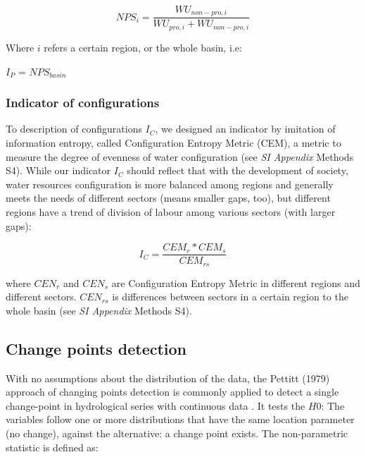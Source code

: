 \documentclass[9pt, twocolumn, twoside, lineno]{pnas-new}
\begin{document}
{	$$ NPS_{i} = \frac{WU_{non-pro, i}}{WU_{pro, i} + WU_{non-pro, i}} $$

	Where $i$ refers a certain region, or the whole basin, i.e:

	$I_P$ = $NPS_{basin}$

	\subsubsection*{Indicator of configurations}
	To description of configurations $I_C$, we designed an indicator by imitation of information entropy, called Configuration Entropy Metric (CEM), a metric to measure the degree of evenness of water configuration (see \textit{SI Appendix} Methods S4).
	While our indicator $I_C$ should reflect that with the development of society, water resources configuration is more balanced among regions and generally meets the needs of different sectors (means smaller gaps, too), but different regions have a trend of division of labour among various sectors (with larger gaps):

	$$ I_C = \frac{CEM_{r}*CEM_{s}}{CEM_{rs}}$$
	
	where $CEN_{r}$ and $CEN_{s}$ are Configuration Entropy Metric in different regions and different sectors. $CEN_{rs}$ is differences between sectors in a certain region to the whole basin (see \textit{SI Appendix} Methods S4). 

	\subsection*{Change points detection}

		With no assumptions about the distribution of the data, the Pettitt (1979) approach of changing points detection is commonly applied to detect a single change-point in hydrological series with continuous data \cite{pettittNonParametricApproachChangePoint1979}. 
		It tests the $H0$: The variables follow one or more distributions that have the same location parameter (no change), against the alternative: a change point exists. The non-parametric statistic is defined as:
	
}
\end{document}
